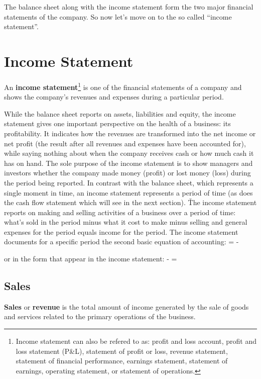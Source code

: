 The balance sheet along with the income statement form the two major financial statements of the company. So now let's
move on to the so called ``income statement''.

\section{Income Statement}

An \textbf{income statement}\footnote{Income statement can also be refered to as: profit and loss account, profit
and loss statement (P\&L), statement of profit or loss, revenue statement, statement of financial performance,
earnings statement, statement of earnings, operating statement, or statement of operations.} is one of the financial
statements of a company and shows the company's revenues and expenses during a particular period.
\ed

While the balance sheet reports on assets, liabilities and equity, the income statement gives one important
perspective on the health of a business: its profitability. It indicates how the revenues are transformed into the
net income or net profit (the result after all revenues and expenses have been accounted for), while saying nothing
about when the company receives cash or how much cash it has on hand. The sole purpose of the income statement is to
show managers and investors whether the company made money (profit) or lost money (loss) during the period being
reported. In contrast with the balance sheet, which represents a single moment in time, an income statement
represents a period of time (as does the cash flow statement which will see in the next section). \v

The income statement reports on making and selling activities of a business over a period of time: what's sold in the
period minus what it cost to make minus selling and general expenses for the period equals income for the period. The
income statement documents for a specific period the second basic equation of accounting:
\bse
{} =  - 
\ese

or in the form that appear in the income statement:
\bse
{} -  = 
\ese

\subsection{Sales}

\textbf{Sales} or \textbf{revenue} is the total amount of income generated by the sale of goods and services related to the
primary operations of the business.
\ed

